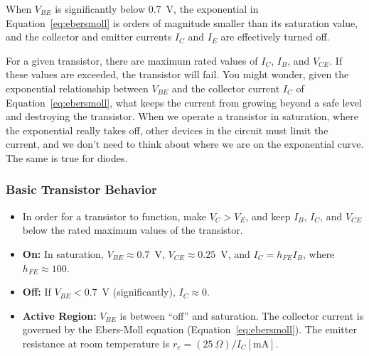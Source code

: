\documentclass[11pt]{article}
\begin{document}
When $V_{BE}$ is significantly below 0.7~V, the exponential in
Equation~\ref{eq:ebersmoll} is orders of magnitude smaller than its
saturation value, and the collector and emitter currents $I_C$ and
$I_E$ are effectively turned off.

For a given transistor, there are maximum rated values of $I_C$,
$I_B$, and $V_{CE}$. If these values are exceeded, the transistor will
fail. You might wonder, given the exponential relationship between
$V_{BE}$ and the collector current $I_C$ of
Equation~\ref{eq:ebersmoll}, what keeps the current from growing
beyond a safe level and destroying the transistor. When we operate a
transistor in saturation, where the exponential really takes off,
other devices in the circuit must limit the current, and we don't need
to think about where we are on the exponential curve. The same is true
for diodes.

\htmlrule
\begin{latexonly}
  \noindent
  \hrulefill
\end{latexonly}
\subsubsection*{Basic Transistor Behavior}
\begin{itemize}
\item In order for a transistor to function, make $V_C > V_E$, and
  keep $I_B$, $I_C$, and $V_{CE}$ below the rated maximum values of
  the transistor.

\item \textbf{On:} In saturation, $V_{BE} \approx 0.7$~V, $V_{CE}
  \approx 0.25$~V, and $I_C = h_{FE} I_B$, where $h_{FE} \approx 100$.

\item \textbf{Off:} If $V_{BE} < 0.7$~V (significantly), $I_C \approx
  0$.

\item \textbf{Active Region:} $V_{BE}$ is between ``off'' and
  saturation. The collector current is governed by the Ebers-Moll
  equation (Equation~\ref{eq:ebersmoll}). The emitter resistance at
  room temperature is $r_e = (25~\Omega)/I_C[\mathrm{mA}]$.
\end{itemize}
\begin{latexonly}
  \noindent
  \hrulefill
\end{latexonly}
\htmlrule
\end{document}
